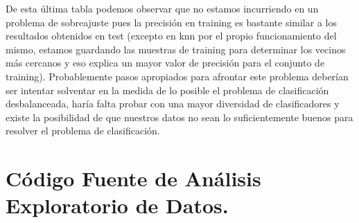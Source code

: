 \documentclass[a4paper,12pt, oneside]{book}
\begin{document}
De esta última tabla podemos observar que no estamos incurriendo en un problema de sobreajuste pues la precisión en training es bastante similar a los resultados obtenidos en test (excepto en knn por el propio funcionamiento del mismo, estamos guardando las muestras de training para determinar los vecinos más cercanos y eso explica un mayor valor de precisión para el conjunto de training). Probablemente pasos apropiados para afrontar este problema deberían ser intentar solventar en la medida de lo posible el problema de clasificación desbalanceada, haría falta probar con una mayor diversidad de clasificadores y existe la posibilidad de que nuestros datos no sean lo suficientemente buenos para resolver el problema de clasificación.\\
\appendix
\chapter{Código Fuente de Análisis Exploratorio de Datos.}
\end{document}
